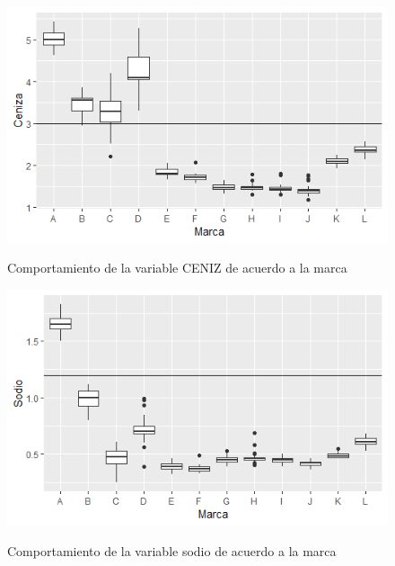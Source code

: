 \documentclass[pdf]{beamer}
\begin{document}
\begin{frame}
\begin{figure}[h]
\centering
\includegraphics[scale=.65]{images/ceniz.png} 
\label{i6}
\caption{Comportamiento de la variable CENIZ de acuerdo a la marca}
\end{figure}
\end{frame}


\begin{frame}
\begin{figure}[h]
\centering
\includegraphics[scale=.65]{images/sodio.png} 
\label{i7}
\caption{Comportamiento de la variable sodio de acuerdo a la marca}
\end{figure}
\end{frame}
\end{document}
